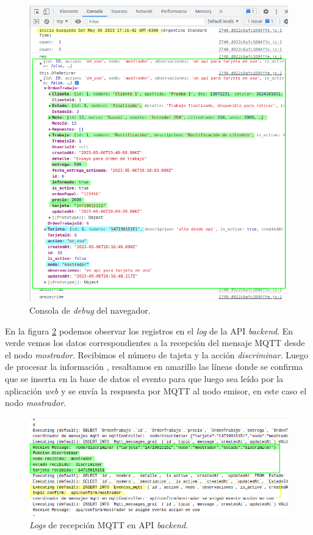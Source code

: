 \begin{figure}[H]
	\centering
	\includegraphics[scale=.50]{./Figures/ensayo-1/21.retirar-web-2.png}
	\caption{Consola de \textit{debug} del navegador.}
	\label{fig:ensayoretirar-web-2}
\end{figure}

En la figura \ref{fig:ensayoretirarapievento} podemos observar los registros en el \textit{log} de la API \textit{backend}. En verde vemos los datos correspondientes a la recepción del mensaje MQTT desde el nodo \textit{mostrador}. Recibimos el número de tajeta y la acción \textit{discriminar}. Luego de procesar la información , resaltamos en amarillo las líneas donde se confirma que se inserta en la base de datos el evento para que luego sea leído por la aplicación \textit{web} y se envía la respuesta por MQTT al nodo emisor, en este caso el nodo \textit{mostrador}.  

\begin{figure}[H]
	\centering
	\includegraphics[width=\textwidth]{./Figures/ensayo-1/22.retirar-api-evento.png}
	\caption{\textit{Logs} de recepción MQTT en API \textit{backend}.}
	\label{fig:ensayoretirarapievento}
\end{figure}

